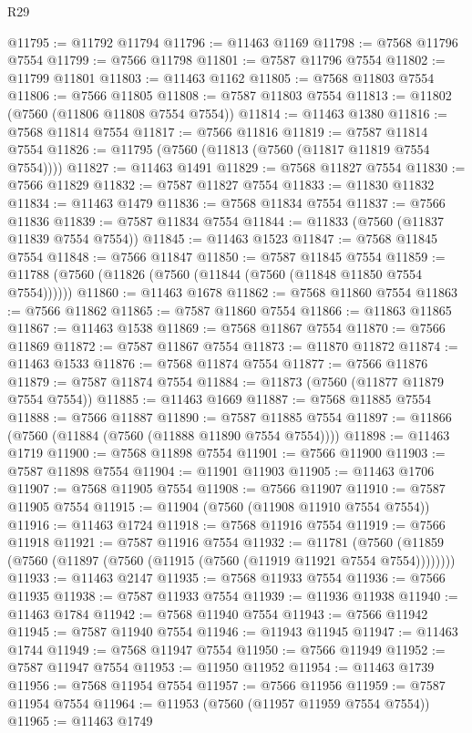 \begin{lexlean}{R29}
\begin{coremodule}
@11795 := @11792 @11794
@11796 := @11463 @1169
@11798 := @7568 @11796 @7554
@11799 := @7566 @11798
@11801 := @7587 @11796 @7554
@11802 := @11799 @11801
@11803 := @11463 @1162
@11805 := @7568 @11803 @7554
@11806 := @7566 @11805
@11808 := @7587 @11803 @7554
@11813 := @11802 (@7560 (@11806 @11808 @7554 @7554))
@11814 := @11463 @1380
@11816 := @7568 @11814 @7554
@11817 := @7566 @11816
@11819 := @7587 @11814 @7554
@11826 := @11795 (@7560 (@11813 (@7560 (@11817 @11819 @7554 @7554))))
@11827 := @11463 @1491
@11829 := @7568 @11827 @7554
@11830 := @7566 @11829
@11832 := @7587 @11827 @7554
@11833 := @11830 @11832
@11834 := @11463 @1479
@11836 := @7568 @11834 @7554
@11837 := @7566 @11836
@11839 := @7587 @11834 @7554
@11844 := @11833 (@7560 (@11837 @11839 @7554 @7554))
@11845 := @11463 @1523
@11847 := @7568 @11845 @7554
@11848 := @7566 @11847
@11850 := @7587 @11845 @7554
@11859 := @11788 (@7560 (@11826 (@7560 (@11844 (@7560 (@11848 @11850 @7554 @7554))))))
@11860 := @11463 @1678
@11862 := @7568 @11860 @7554
@11863 := @7566 @11862
@11865 := @7587 @11860 @7554
@11866 := @11863 @11865
@11867 := @11463 @1538
@11869 := @7568 @11867 @7554
@11870 := @7566 @11869
@11872 := @7587 @11867 @7554
@11873 := @11870 @11872
@11874 := @11463 @1533
@11876 := @7568 @11874 @7554
@11877 := @7566 @11876
@11879 := @7587 @11874 @7554
@11884 := @11873 (@7560 (@11877 @11879 @7554 @7554))
@11885 := @11463 @1669
@11887 := @7568 @11885 @7554
@11888 := @7566 @11887
@11890 := @7587 @11885 @7554
@11897 := @11866 (@7560 (@11884 (@7560 (@11888 @11890 @7554 @7554))))
@11898 := @11463 @1719
@11900 := @7568 @11898 @7554
@11901 := @7566 @11900
@11903 := @7587 @11898 @7554
@11904 := @11901 @11903
@11905 := @11463 @1706
@11907 := @7568 @11905 @7554
@11908 := @7566 @11907
@11910 := @7587 @11905 @7554
@11915 := @11904 (@7560 (@11908 @11910 @7554 @7554))
@11916 := @11463 @1724
@11918 := @7568 @11916 @7554
@11919 := @7566 @11918
@11921 := @7587 @11916 @7554
@11932 := @11781
    (@7560 (@11859 (@7560 (@11897 (@7560 (@11915 (@7560 (@11919 @11921 @7554 @7554))))))))
@11933 := @11463 @2147
@11935 := @7568 @11933 @7554
@11936 := @7566 @11935
@11938 := @7587 @11933 @7554
@11939 := @11936 @11938
@11940 := @11463 @1784
@11942 := @7568 @11940 @7554
@11943 := @7566 @11942
@11945 := @7587 @11940 @7554
@11946 := @11943 @11945
@11947 := @11463 @1744
@11949 := @7568 @11947 @7554
@11950 := @7566 @11949
@11952 := @7587 @11947 @7554
@11953 := @11950 @11952
@11954 := @11463 @1739
@11956 := @7568 @11954 @7554
@11957 := @7566 @11956
@11959 := @7587 @11954 @7554
@11964 := @11953 (@7560 (@11957 @11959 @7554 @7554))
@11965 := @11463 @1749

\end{coremodule}
\end{lexlean}

